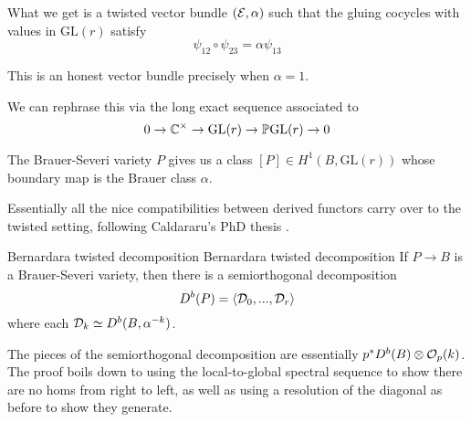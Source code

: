 What we get is a twisted vector bundle $(\mathcal{E}, \alpha)$ such that the gluing cocycles with values in $\mathrm{GL}(r)$ satisfy $$\psi_{12} \circ \psi_{23}=\alpha \psi_{13}$$

This is an honest vector bundle precisely when $\alpha=1$.

We can rephrase this via the long exact sequence associated to $$0\rightarrow \mathbb{C}^\times \rightarrow \mathrm{GL}(r)\rightarrow \mathbb{P} \mathrm{GL}(r)\rightarrow 0$$

The Brauer-Severi variety $P$ gives us a class $[P]\in H^1(B, \mathrm{GL}(r))$ whose boundary map is the Brauer class $\alpha$.

Essentially all the nice compatibilities between derived functors carry over to the twisted setting, following Caldararu's PhD thesis \cite{CaldararuThesis}.

\begin{proposition}{Bernardara twisted decomposition \cite{bernardara_semiorthogonal_2005}}{Bernardara twisted decomposition}
    If $P\rightarrow B$ is a Brauer-Severi variety, then there is a semiorthogonal decomposition $$D^b(P)=\langle \mathcal{D}_0,..., \mathcal{D}_r\rangle$$
    where each $\mathcal{D}_k\simeq D^b(B,\alpha^{-k})$.
\end{proposition}

The pieces of the semiorthogonal decomposition are essentially $p^*D^b(B)\otimes \mathcal{O}_p(k)$. The proof boils down to using the local-to-global spectral sequence to show there are no homs from right to left, as well as using a resolution of the diagonal as before to show they generate.



